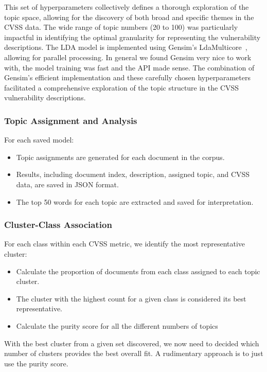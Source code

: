This set of hyperparameters collectively defines a thorough exploration of the topic space, allowing for the discovery of both broad and specific themes in the CVSS data. The wide range of topic numbers (20 to 100) was particularly impactful in identifying the optimal granularity for representing the vulnerability descriptions. The LDA model is implemented using Gensim's LdaMulticore~\cite{gensim}, allowing for parallel processing. In general we found Gensim very nice to work with, the model training was fast and the API made sense. The combination of Gensim's efficient implementation and these carefully chosen hyperparameters facilitated a comprehensive exploration of the topic structure in the CVSS vulnerability descriptions.

\subsubsection{Topic Assignment and Analysis}

For each saved model:

\begin{itemize}
	\item Topic assignments are generated for each document in the corpus.
	\item Results, including document index, description, assigned topic, and CVSS data, are saved in JSON format.
	\item The top 50 words for each topic are extracted and saved for interpretation.
\end{itemize}

\subsubsection{Cluster-Class Association}

For each class within each CVSS metric, we identify the most representative cluster:

\begin{itemize}
	\item Calculate the proportion of documents from each class assigned to each topic cluster.
	\item The cluster with the highest count for a given class is considered its best representative.
	\item Calculate the purity score for all the different numbers of topics
\end{itemize}

With the best cluster from a given set discovered, we now need to decided which number of clusters provides the best overall fit. A rudimentary approach is to just use the purity score.

